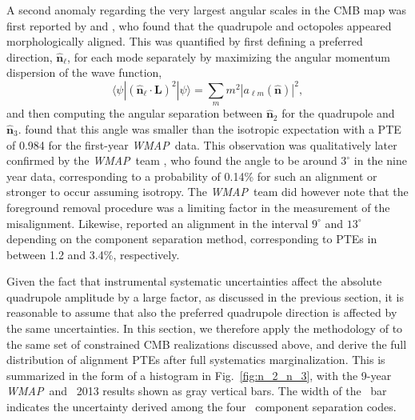 \documentclass[twocolumn]{aa}
\def\WMAP{\textit{WMAP}}
\begin{document}
A second anomaly regarding the very largest angular scales in the CMB
map was first reported by \citet{Tegmark:2003ve} and \citet{dOC2004}, who found
that the quadrupole and octopoles appeared morphologically
aligned. This was quantified by first defining a preferred direction,
$\hat{\mathbf{n}}_\ell$, for each mode separately by maximizing the
angular momentum dispersion of the wave function,
\begin{equation}
  \langle \psi | (\hat{\textbf{n}}_\ell \cdot \textbf{L})^2 |\psi\rangle = \sum_m m^2|a_{\ell m}(\hat{\textbf{n}})|^2,
\end{equation}
and then computing the angular separation between $\hat{\textbf{n}}_2$
for the quadrupole and $\hat{\textbf{n}}_3$.  \cite{dOC2004} found
that this angle was smaller than the isotropic expectation with a PTE
of 0.984 for the first-year \WMAP\ data. This observation was
qualitatively later confirmed by the \WMAP\ team \citep{bennett2012},
who found the angle to be around $3^\circ$ in the nine year data,
corresponding to a probability of 0.14\% for such an alignment or
stronger to occur assuming isotropy. The \WMAP\ team did however note
that the foreground removal procedure was a limiting factor in the
measurement of the misalignment. Likewise, \cite{Planck:2013lks}
reported an alignment in the interval $9^\circ$ and $13^\circ$
depending on the component separation method, corresponding to PTEs in
between 1.2 and 3.4\%, respectively.

Given the fact that instrumental systematic uncertainties affect the
absolute quadrupole amplitude by a large factor, as discussed in the
previous section, it is reasonable to assume that also the preferred
quadrupole direction is affected by the same uncertainties. In this
section, we therefore apply the methodology of \cite{dOC2004} to the
same set of constrained CMB realizations discussed above, and derive
the full distribution of alignment PTEs after full systematics
marginalization. This is summarized in the form of a histogram in
Fig.~\ref{fig:n_2_n_3}, with the 9-year \WMAP\ and \Planck\ 2013
results shown as gray vertical bars. The width of the \Planck\ bar
indicates the uncertainty derived among the four \Planck\ component
separation codes.
\end{document}
